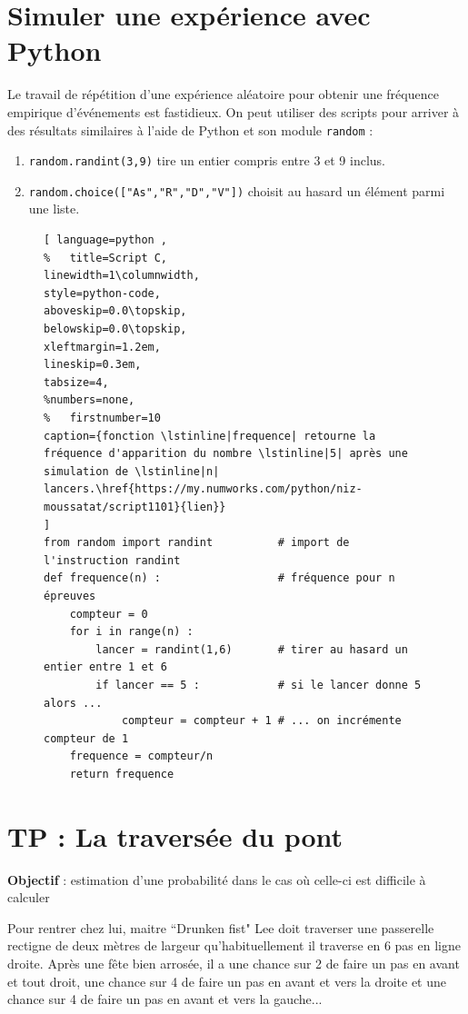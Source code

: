 \documentclass[main.tex]{subfiles}
\begin{document}
\section{Simuler une expérience avec Python}
\noindent Le travail de répétition d'une expérience aléatoire pour obtenir une fréquence empirique d'événements est fastidieux. On peut utiliser des scripts pour arriver à des résultats similaires à l'aide de Python et son module \lstinline|random| :
\begin{enumerate}[label=\textbullet,leftmargin=*]
	\item \lstinline|random.randint(3,9)| tire un entier compris entre 3 et 9 inclus.
	\item \lstinline|random.choice(["As","R","D","V"])| choisit au hasard un élément parmi une liste.
\end{enumerate}

\begin{figure}[!hb] \centering
\begin{lstlisting}[ language=python , 
%	title=Script C,   
linewidth=1\columnwidth,
style=python-code,    
aboveskip=0.0\topskip,
belowskip=0.0\topskip,
xleftmargin=1.2em,
lineskip=0.3em,
tabsize=4, 
%numbers=none,
%	firstnumber=10  
caption={fonction \lstinline|frequence| retourne la fréquence d'apparition du nombre \lstinline|5| après une simulation de \lstinline|n| lancers.\href{https://my.numworks.com/python/niz-moussatat/script1101}{lien}}
] 
from random import randint 			# import de l'instruction randint
def frequence(n) :					# fréquence pour n épreuves			
	compteur = 0
	for i in range(n) :
		lancer = randint(1,6) 		# tirer au hasard un entier entre 1 et 6
		if lancer == 5 :			# si le lancer donne 5 alors ...
			compteur = compteur + 1	# ... on incrémente compteur de 1
	frequence = compteur/n
	return frequence 
\end{lstlisting} 
\end{figure} 


\newpage 
{}  
\pagestyle{scrheadings} %
\onehalfspacing
\section{TP : La traversée du pont}
\begin{eBox}
	\textbf{Objectif} : estimation d'une probabilité dans le cas où celle-ci est difficile à calculer
\end{eBox}
Pour rentrer chez lui, maitre ``Drunken fist" Lee doit traverser une passerelle rectigne de deux mètres de largeur qu'habituellement il traverse en 6 pas en ligne droite. Après une fête bien arrosée, il a une chance sur 2 de faire un pas en avant et tout droit, une chance sur 4 de faire un pas en avant et vers la droite et une chance sur 4 de faire un pas en avant et vers la gauche... 
 
\end{document}
